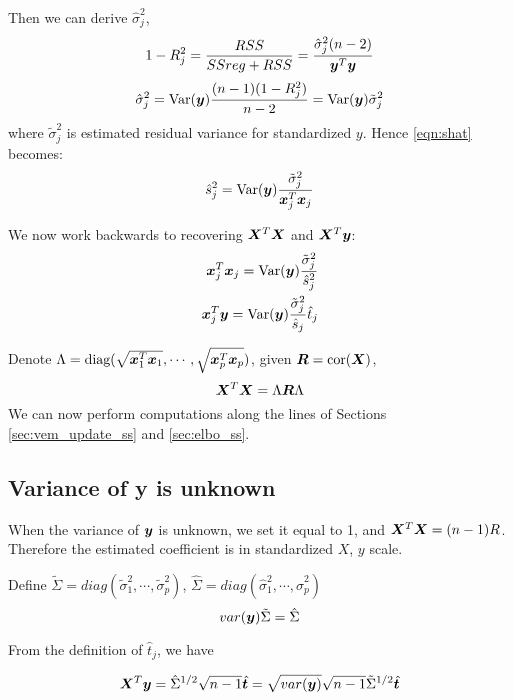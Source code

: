 Then we can derive $\hat{\sigma}_{j}^{2}$,
\begin{equation}
    1-R_{j}^{2} = \frac{RSS}{SSreg + RSS} = \frac{\hat{\sigma}_{j}^2(n-2)}{\bm y^{T}\bm y}
\end{equation}
\begin{equation}
    \hat{\sigma}_{j}^2 = \text{Var}(\bm y)\frac{(n-1)(1-R_{j}^2)}{n-2} = \text{Var}(\bm y) \tilde{\sigma}_{j}^2
\end{equation}
where $\tilde{\sigma}_j^2$ is estimated residual variance for standardized $y$. Hence \eqref{eqn:shat} becomes:
\begin{equation}
    \hat{s}_{j}^{2} = \text{Var}(\bm y)\frac{\tilde{\sigma}_{j}^2}{\bm x_j^{T}\bm x_j}
\end{equation}

We now work backwards to recovering $\bm X^T\bm X$ and $\bm X^T\bm y$:
\begin{align}
    \bm x_j^{T}\bm x_j = \text{Var}(\bm y)\frac{\tilde{\sigma}_{j}^2}{\hat{s}_{j}^{2}} \\
    \bm x_j^{T}\bm y = \text{Var}(\bm y)\frac{\tilde{\sigma}_{j}^2}{\hat{s}_{j}} \hat{t}_{j}
\end{align}

Denote $\Lambda = \text{diag}(\sqrt{\bm x_1^{T}\bm x_1}, \cdots, \sqrt{\bm x_p^{T}\bm x_p})$, given $\bm R = \text{cor}(\bm X)$,
\begin{equation}
    \bm X^T \bm X = \Lambda \bm R \Lambda
\end{equation}
We can now perform \susie computations along the lines of Sections \ref{sec:vem_update_ss} and \ref{sec:elbo_ss}.

\subsection{Variance of y is unknown}

When the variance of $\bm y$ is unknown, we set it equal to 1, and $\bm X^T \bm X = (n-1) R$. Therefore the estimated coefficient is in standardized $X$, $y$ scale.

Define $\tilde{\Sigma} = diag(\tilde{\sigma}_{1}^2, \cdots, \tilde{\sigma}_{p}^2)$, $\hat{\Sigma} = diag(\hat{\sigma}_{1}^2, \cdots, \hat{\sigma}_{p}^2)$
\begin{equation}
    var(\bm y)\tilde{\Sigma} = \hat{\Sigma}
\end{equation}

From the definition of $\hat{t}_{j}$, we have

\begin{equation}
    \bm X^{T}\bm y = \hat{\Sigma}^{1/2} \sqrt{n-1} \hat{\bm{t}} = \sqrt{var(\bm y)} \sqrt{n-1} \tilde{\Sigma}^{1/2} \hat{\bm{t}}
\end{equation}

